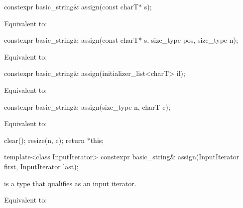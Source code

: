 %
\begin{itemdecl}
constexpr basic_string& assign(const charT* s);
\end{itemdecl}

\begin{itemdescr}
\pnum
\effects
Equivalent to: 
\end{itemdescr}

%
\begin{itemdecl}
constexpr basic_string& assign(const charT* s, size_type pos, size_type n);
\end{itemdecl}

\begin{itemdescr}
\pnum
\effects
Equivalent to:
\end{itemdescr}

%
\begin{itemdecl}
constexpr basic_string& assign(initializer_list<charT> il);
\end{itemdecl}

\begin{itemdescr}
\pnum
\effects
Equivalent to: 
\end{itemdescr}

%
\begin{itemdecl}
constexpr basic_string& assign(size_type n, charT c);
\end{itemdecl}

\begin{itemdescr}
\pnum
\effects
Equivalent to:
\begin{codeblock}
clear();
resize(n, c);
return *this;
\end{codeblock}
\end{itemdescr}

%
\begin{itemdecl}
template<class InputIterator>
  constexpr basic_string& assign(InputIterator first, InputIterator last);
\end{itemdecl}

\begin{itemdescr}
\pnum
\constraints
{} is a type that qualifies as an input
iterator.

\pnum
\effects
Equivalent to: 
\end{itemdescr}

